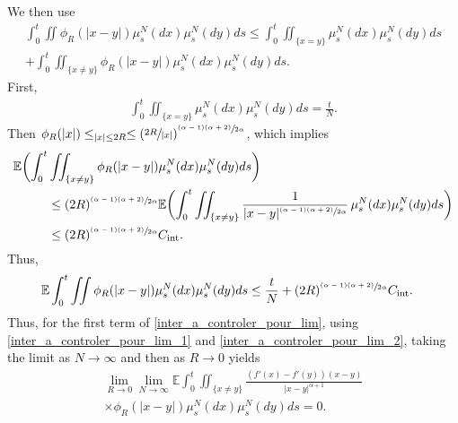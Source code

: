 \documentclass[11pt]{article}
\makeatletter
\DeclareRobustCommand{\mathbbm}[1]{\csname jepbb@#1\endcsname}
\let\mathds\mathbbm
\newcommand{\rint}{\mathrm{int}}
\theoremstyle{plain}
\theoremstyle{definition}
\makeatother
\begin{document}
We then use
\begin{multline*}
\int_{0}^t\iint\phi_R(|x-y|)\mu^N_s(dx)\mu^N_s(dy)ds
\leq \int_{0}^t\iint_{\{x=y\}}\mu^N_s(dx)\mu^N_s(dy)ds\\
+\int_{0}^t\iint_{\{x\neq y\}}\phi_R(|x-y|)\mu^N_s(dx)\mu^N_s(dy)ds.
\end{multline*}
First,
\begin{align*}
\int_{0}^t\iint_{\{x=y\}}\mu^N_s(dx)\mu^N_s(dy)ds=\frac{t}{N}.
\end{align*}
Then $\phi_R(|x|)\leq \mathds{1}_{|x|\leq2R}\leq\left(\sfrac{2R}{|x|}\right)^{\sfrac{(\alpha-1)(\alpha+2)}{2\alpha}}$,
which implies
\begin{align*}
\mathbb{E}\biggl(\int_{0}^t&\iint_{\{x\neq y\}}\phi_R(|x-y|)\mu^N_s(dx)\mu^N_s(dy)ds\biggr)\\
&\leq(2R)^{\sfrac{(\alpha-1)(\alpha+2)}{2\alpha}}\mathbb{E}\biggl(\int_{0}^t\iint_{\{x\neq y\}}\frac{1}{|x-y|^{\sfrac{(\alpha-1)(\alpha+2)}{2\alpha}}}\,\mu^N_s(dx)\mu^N_s(dy)ds\biggr)\\
&\leq (2R)^{\sfrac{(\alpha-1)(\alpha+2)}{2\alpha}}C_{\rint}.
\end{align*}
Thus,
\begin{align}
\mathbb{E}\int_{0}^t\iint\phi_R(|x-y|)\mu^N_s(dx)\mu^N_s(dy)ds&\leq \frac{t}{N}+(2R)^{\sfrac{(\alpha-1)(\alpha+2)}{2\alpha}}C_{\rint}\label{inter_a_controler_pour_lim_2}.
\end{align}
Thus, for the first term of \eqref{inter_a_controler_pour_lim}, using \eqref{inter_a_controler_pour_lim_1} and \eqref{inter_a_controler_pour_lim_2}, taking the limit as $N\to\infty$ and then as $R\to0$ yields
\begin{multline}\label{I_4_terme1}
\lim_{R\to0}\lim_{N\to\infty}
\mathbb{E}\int_{0}^t\iint_{\{x\neq y\}}\frac{(f'(x)-f'(y))(x-y)}{|x-y|^{\alpha+1}}\\
\times\phi_R(|x-y|)\mu^N_s(dx)\mu^N_s(dy)ds=0.
\end{multline}
\end{document}
